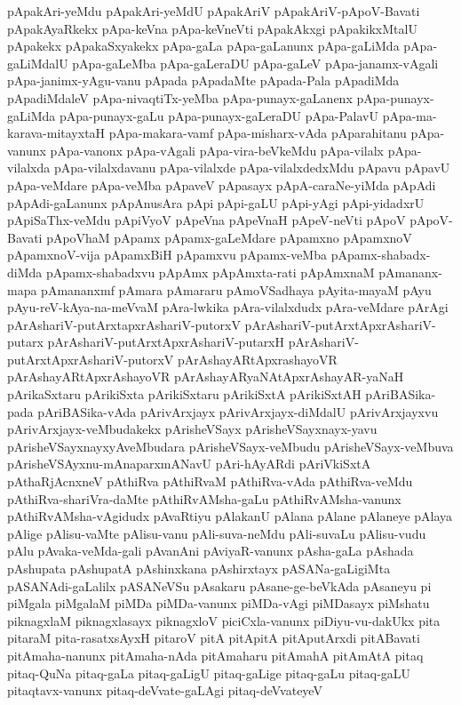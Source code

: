 {pApakAri-yeMdu
pApakAri-yeMdU
pApakAriV
pApakAriV-pApoV-Bavati
pApakAyaRkekx
pApa-keVna
pApa-keVneVti
pApakAkxgi
pApakikxMtalU
pApakekx
pApakaSxyakekx
pApa-gaLa
pApa-gaLanunx
pApa-gaLiMda
pApa-gaLiMdalU
pApa-gaLeMba
pApa-gaLeraDU
pApa-gaLeV
pApa-janamx-vAgali
pApa-janimx-yAgu-vanu
pApada
pApadaMte
pApada-Pala
pApadiMda
pApadiMdaleV
pApa-nivaqtiTx-yeMba
pApa-punayx-gaLanenx
pApa-punayx-gaLiMda
pApa-punayx-gaLu
pApa-punayx-gaLeraDU
pApa-PalavU
pApa-ma-karava-mitayxtaH
pApa-makara-vamf
pApa-misharx-vAda
pAparahitanu
pApa-vanunx
pApa-vanonx
pApa-vAgali
pApa-vira-beVkeMdu
pApa-vilalx
pApa-vilalxda
pApa-vilalxdavanu
pApa-vilalxde
pApa-vilalxdedxMdu
pApavu
pApavU
pApa-veMdare
pApa-veMba
pApaveV
pApasayx
pApA-caraNe-yiMda
pApAdi
pApAdi-gaLanunx
pApAnusAra
pApi
pApi-gaLU
pApi-yAgi
pApi-yidadxrU
pApiSaThx-veMdu
pApiVyoV
pApeVna
pApeVnaH
pApeV-neVti
pApoV
pApoV-Bavati
pApoVhaM
pApamx
pApamx-gaLeMdare
pApamxno
pApamxnoV
pApamxnoV-vija
pApamxBiH
pApamxvu
pApamx-veMba
pApamx-shabadx-diMda
pApamx-shabadxvu
pApAmx
pApAmxta-rati
pApAmxnaM
pAmananx-mapa
pAmananxmf
pAmara
pAmararu
pAmoVSadhaya
pAyita-mayaM
pAyu
pAyu-reV-kAya-na-meVvaM
pAra-lwkika
pAra-vilalxdudx
pAra-veMdare
pArAgi
pArAshariV-putArxtapxrAshariV-putorxV
pArAshariV-putArxtApxrAshariV-putarx
pArAshariV-putArxtApxrAshariV-putarxH
pArAshariV-putArxtApxrAshariV-putorxV
pArAshayARtApxrashayoVR
pArAshayARtApxrAshayoVR
pArAshayARyaNAtApxrAshayAR-yaNaH
pArikaSxtaru
pArikiSxta
pArikiSxtaru
pArikiSxtA
pArikiSxtAH
pAriBASika-pada
pAriBASika-vAda
pArivArxjayx
pArivArxjayx-diMdalU
pArivArxjayxvu
pArivArxjayx-veMbudakekx
pArisheVSayx
pArisheVSayxnayx-yavu
pArisheVSayxnayxyAveMbudara
pArisheVSayx-veMbudu
pArisheVSayx-veMbuva
pArisheVSAyxnu-mAnaparxmANavU
pAri-hAyARdi
pAriVkiSxtA
pAthaRjAcnxneV
pAthiRva
pAthiRvaM
pAthiRva-vAda
pAthiRva-veMdu
pAthiRva-shariVra-daMte
pAthiRvAMsha-gaLu
pAthiRvAMsha-vanunx
pAthiRvAMsha-vAgidudx
pAvaRtiyu
pAlakanU
pAlana
pAlane
pAlaneye
pAlaya
pAlige
pAlisu-vaMte
pAlisu-vanu
pAli-suva-neMdu
pAli-suvaLu
pAlisu-vudu
pAlu
pAvaka-veMda-gali
pAvanAni
pAviyaR-vanunx
pAsha-gaLa
pAshada
pAshupata
pAshupatA
pAshinxkana
pAshirxtayx
pASANa-gaLigiMta
pASANAdi-gaLalilx
pASANeVSu
pAsakaru
pAsane-ge-beVkAda
pAsaneyu
pi
piMgala
piMgalaM
piMDa
piMDa-vanunx
piMDa-vAgi
piMDasayx
piMshatu
piknagxlaM
piknagxlasayx
piknagxloV
piciCxla-vanunx
piDiyu-vu-dakUkx
pita
pitaraM
pita-rasatxsAyxH
pitaroV
pitA
pitApitA
pitAputArxdi
pitABavati
pitAmaha-nanunx
pitAmaha-nAda
pitAmaharu
pitAmahA
pitAmAtA
pitaq
pitaq-QuNa
pitaq-gaLa
pitaq-gaLigU
pitaq-gaLige
pitaq-gaLu
pitaq-gaLU
pitaqtavx-vanunx
pitaq-deVvate-gaLAgi
pitaq-deVvateyeV
}
